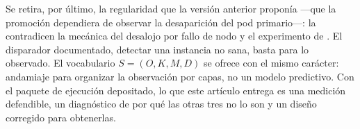 Se retira, por último, la regularidad que la versión anterior proponía —que la promoción dependiera de observar la desaparición del pod primario—: la contradicen la mecánica del desalojo por fallo de nodo y el experimento de \citet{sivko2026}. El disparador documentado, detectar una instancia no sana, basta para lo observado. El vocabulario $S=(O,K,M,D)$ se ofrece con el mismo carácter: andamiaje para organizar la observación por capas, no un modelo predictivo. Con el paquete de ejecución depositado, lo que este artículo entrega es una medición defendible, un diagnóstico de por qué las otras tres no lo son y un diseño corregido para obtenerlas.

